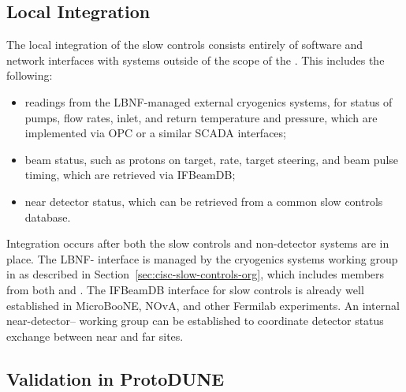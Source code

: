 \subsection{Local Integration}
\label{sec:fdgen-slow-cryo-slow-loc-integ}


The local integration of the slow controls consists entirely of software
and network interfaces with systems outside of the scope of the .
This includes the following:
\begin{itemize}
\item readings from the LBNF-managed external cryogenics systems, for status of pumps, flow rates, inlet, and return temperature and pressure, which are implemented via OPC or a similar SCADA interfaces;
\item beam status, such as protons on target, rate, target steering, and beam pulse timing, which are retrieved via IFBeamDB;
\item near detector status, which can be retrieved from a common slow controls database.
\end{itemize}

Integration occurs after both the slow controls and non-detector
systems are in place.  The LBNF- interface is managed by the
cryogenics systems working group in  as described in Section~\ref{sec:cisc-slow-controls-org}, which includes members from both  and . %
The IFBeamDB interface for slow controls is already well established in MicroBooNE, NOvA, and other Fermilab experiments. An internal near-detector-- working group can be established 
to coordinate detector status exchange between near and far sites.

\subsection{Validation in ProtoDUNE}
\label{sec:cisc-slow-control-pdsp}

